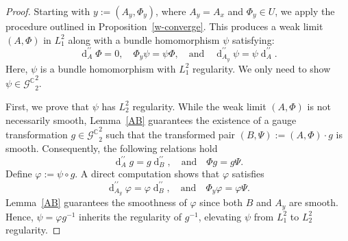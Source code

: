 \documentclass[a4paper]{amsart}
\theoremstyle{definition}
\theoremstyle{remark}
\numberwithin{equation}{section}
\begin{document}
\begin{proof}

Starting with $y := (A_y, \Phi_y)$, where $A_y = A_x$ and $\Phi_y \in U$, we apply the procedure outlined in Proposition~\ref{w-converge}. This produces a weak limit $(A, \Phi)$ in $L_1^2$ along with a bundle homomorphism $\psi$ satisfying:  
\[
\operatorname{d}_{A}^{\prime\prime}\Phi=0,\quad\Phi_y \psi = \psi \Phi, \quad \text{and} \quad \operatorname{d}_{A_y}^{\prime\prime} \psi = \psi \operatorname{d}_{A}^{\prime\prime}.
\]  
Here, $\psi$ is a bundle homomorphism with $L_1^2$ regularity. We only need to show $\psi \in {\mathscr{G}^\mathbb{C}}_2^2$.

First, we prove that $\psi$ has $L_2^2$ regularity. While the weak limit $(A, \Phi)$ is not necessarily smooth, Lemma~\ref{AB} guarantees the existence of a gauge transformation $g \in {\mathscr{G}^\mathbb{C}}_2^2$ such that the transformed pair $(B, \Psi) := (A, \Phi) \cdot g$ is smooth. Consequently, the following relations hold
\[
\operatorname{d}_A^{\prime\prime} g = g \operatorname{d}_B^{\prime\prime}, \quad \text{and} \quad \Phi g = g \Psi.
\]
Define $\varphi := \psi \circ g$. A direct computation shows that $\varphi$ satisfies
\begin{equation}
\operatorname{d}_{A_y}^{\prime\prime} \varphi = \varphi \operatorname{d}_B^{\prime\prime}, \quad \text{and} \quad \Phi_y \varphi = \varphi \Psi. \label{*}
\end{equation}
Lemma~\ref{AB} guarantees the smoothness of $\varphi$ since both $B$ and $A_y$ are smooth. Hence, $\psi = \varphi g^{-1}$ inherits the regularity of $g^{-1}$, elevating $\psi$ from $L_1^2$ to $L_2^2$ regularity.


\end{proof}
\end{document}
